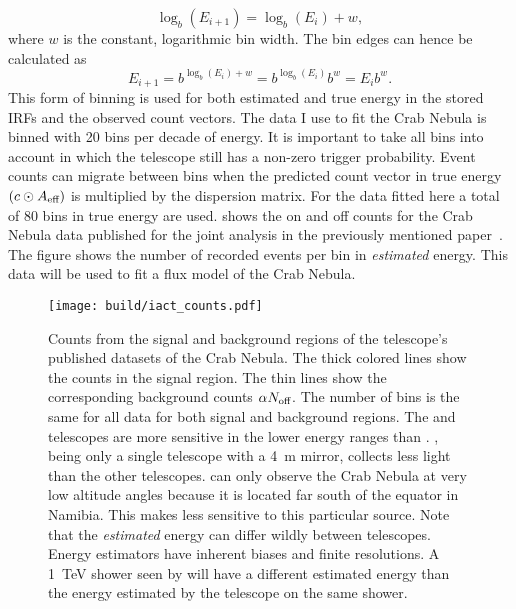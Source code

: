 \begin{equation}
  \log_b(E_{i + 1}) = \log_b(E_{i}) + w,
\end{equation}
where $w$ is the constant, logarithmic bin width. The bin edges can hence be calculated as 
\begin{equation}
  E_{i + 1} = b^{\log_b(E_{i}) + w} = b^{\log_b(E_{i})} b^w = E_i b^w.
\end{equation}
This form of binning is used for both estimated and true energy in the stored IRFs and the observed count vectors. The data I use to fit 
the Crab Nebula is binned with \num{20} bins per decade of energy. It is important to take all bins into account in which 
the telescope still has a non-zero trigger probability. Event counts can migrate between bins when the predicted count vector in true energy $(c \odot A_\text{eff})$ is multiplied
by the dispersion matrix. For the data fitted here a total of \num{80} bins in true energy are used.
 shows the on and off counts for the Crab Nebula data published for the joint analysis in the previously mentioned paper~\cite{joint_crab}.
The figure shows the number of recorded events per bin in \emph{estimated} energy.
This data will be used to fit a flux model of the Crab Nebula. 

\begin{figure}
  \centering
  \texttt{[image: build/iact\_counts.pdf]}
  \caption[Measured counts in the open datasets.]{Counts from the signal and background regions of the telescope's published datasets of the Crab Nebula. The thick colored lines 
  show the counts in the signal region. The thin lines show the corresponding background counts $\alpha N_\text{off}$.
  The number of bins is the same for all data for both signal and background regions. 
  The \magic and \veritas telescopes are more sensitive in the lower energy ranges than \fact. \fact, being only a single telescope with a \SI{4}{\metre} mirror, collects less light 
  than the other telescopes. \hess can only observe the Crab Nebula at very low altitude angles because it is located far south of the equator in Namibia.
  This makes \hess less sensitive to this particular source. Note that the \emph{estimated} energy can differ wildly between telescopes. 
  Energy estimators have inherent biases and finite resolutions. A \SI{1}{TeV} shower seen by \fact will have a different estimated energy than the energy estimated by the \magic 
  telescope on the same shower.
  }
  \label{fig:iact_counts}
\end{figure}

